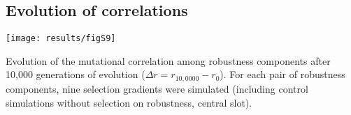\documentclass[10pt,a4paper]{article}
\begin{document}
\begin{appendices}
    \subsection*{Evolution of correlations}
    
	\begin{center}
	\texttt{[image: results/figS9]} 
	\end{center}
	
	{\color{Gray} Evolution of the mutational correlation among robustness components after 10,000 generations of evolution ($\Delta r = r_{10,0000} - r_0$). For each pair of robustness components, nine selection gradients were simulated (including control simulations without selection on robustness, central slot). }
	
\end{appendices}
\end{document}

